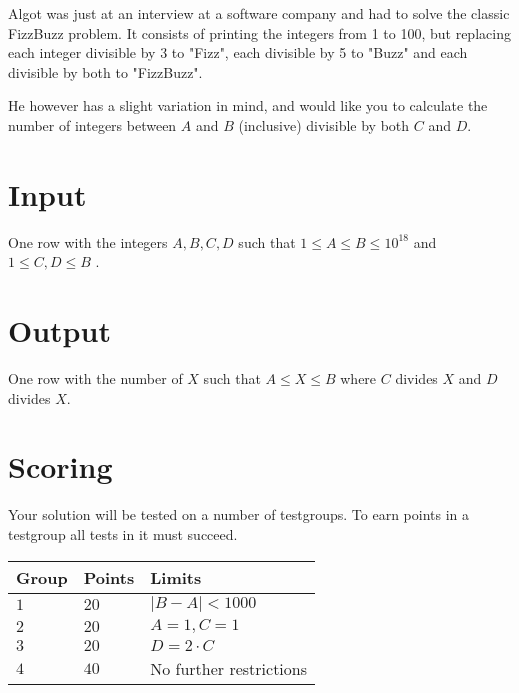 \noindent
Algot was just at an interview at a software company and had to solve the classic FizzBuzz problem. It consists of printing the integers from 1 to 100, but replacing each integer divisible by 3 to "Fizz", each divisible by 5 to "Buzz" and each divisible by both to "FizzBuzz".

\noindent
He however has a slight variation in mind, and would like you to calculate the number of integers between $A$ and $B$ (inclusive) divisible by both $C$ and $D$.
\section*{Input}
\noindent
One row with the integers $A, B, C, D$ such that \(1 \leq A \leq B \leq 10^{18}\) and \(1 \leq C, D \leq B\) .
\section*{Output}
\noindent
One row with the number of $X$ such that $A \le X \le B$ where $C$ divides $X$ and $D$ divides $X$.
\section*{Scoring}
\noindent
Your solution will be tested on a number of testgroups.
To earn points in a testgroup all tests in it must succeed.
\noindent
\begin{tabular}{| l | l | l |}
\hline
  Group & Points & Limits \\ \hline
  $1$    & $20$       &  $|B-A| < 1000$ \\ \hline 
  $2$    & $20$       &  $A = 1, C = 1$ \\ \hline
  $3$    & $20$       &  $D = 2 \cdot C$ \\ \hline
  $4$    & $40$       &  No further restrictions \\ \hline
\end{tabular}
